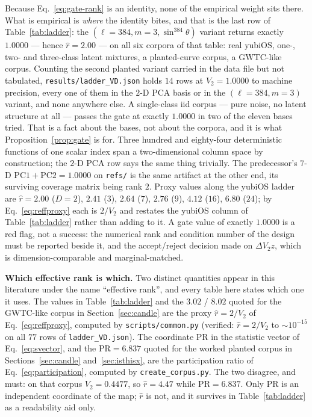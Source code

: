\documentclass[11pt,a4paper]{article}
\theoremstyle{plain}
\theoremstyle{remark}
\theoremstyle{plain}
\begin{document}
Because Eq.~\eqref{eq:gate-rank} is an identity, none of the empirical weight sits there. What is empirical is \emph{where} the identity bites, and that is the last row of Table~\ref{tab:ladder}: the $(\ell{=}384,m{=}3,\sin^{384}\theta)$ variant returns exactly $1.0000$ --- hence $\hat r=2.00$ --- on all six corpora of that table: real yubiOS, one-, two- and three-class latent mixtures, a planted-curve corpus, a GWTC-like corpus. Counting the second planted variant carried in the data file but not tabulated, \texttt{results/ladder\_VD.json} holds $14$ rows at $V_2=1.0000$ to machine precision, every one of them in the $2$-D PCA basis or in the $(\ell{=}384,m{=}3)$ variant, and none anywhere else. A single-class iid corpus --- pure noise, no latent structure at all --- passes the gate at exactly $1.0000$ in two of the eleven bases tried. That is a fact about the bases, not about the corpora, and it is what Proposition~\ref{prop:gate} is for. Three hundred and eighty-four deterministic functions of one scalar index span a two-dimensional column space by construction; the $2$-D PCA row says the same thing trivially. The predecessor's $7$-D $\mathrm{PC1}+\mathrm{PC2}=1.0000$ on \texttt{refs/} is the same artifact at the other end, its surviving coverage matrix being rank $2$. Proxy values along the yubiOS ladder are $\hat r=2.00$ ($D{=}2$), $2.41$ ($3$), $2.64$ ($7$), $2.76$ ($9$), $4.12$ ($16$), $6.80$ ($24$); by Eq.~\eqref{eq:reffproxy} each is $2/V_2$ and restates the yubiOS column of Table~\ref{tab:ladder} rather than adding to it. A gate value of exactly $1.0000$ is a red flag, not a success: the numerical rank and condition number of the design must be reported beside it, and the accept/reject decision made on $\Delta V_2z$, which is dimension-comparable and marginal-matched.

\textbf{Which effective rank is which.} Two distinct quantities appear in this literature under the name ``effective rank'', and every table here states which one it uses. The values in Table~\ref{tab:ladder} and the $3.02$ / $8.02$ quoted for the GWTC-like corpus in Section~\ref{sec:candle} are the proxy $\hat r=2/V_2$ of Eq.~\eqref{eq:reffproxy}, computed by \texttt{scripts/common.py} (verified: $\hat r=2/V_2$ to $\sim10^{-15}$ on all $77$ rows of \texttt{ladder\_VD.json}). The coordinate $\mathrm{PR}$ in the statistic vector of Eq.~\eqref{eq:svector}, and the $\mathrm{PR}=6.837$ quoted for the worked planted corpus in Sections~\ref{sec:candle} and~\ref{sec:isthisx}, are the participation ratio of Eq.~\eqref{eq:participation}, computed by \texttt{create\_corpus.py}. The two disagree, and must: on that corpus $V_2=0.4477$, so $\hat r=4.47$ while $\mathrm{PR}=6.837$. Only $\mathrm{PR}$ is an independent coordinate of the map; $\hat r$ is not, and it survives in Table~\ref{tab:ladder} as a readability aid only.
\end{document}
